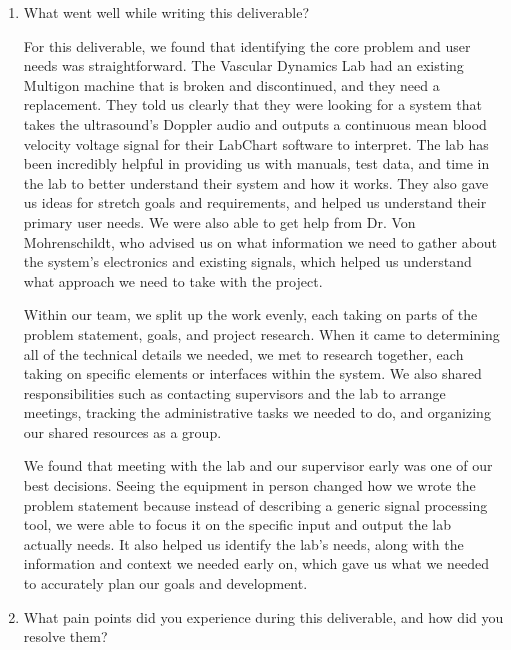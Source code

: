 \documentclass{article}
\begin{document}
% 

\begin{enumerate}
    \item What went well while writing this deliverable? 

    For this deliverable, we found that identifying the core problem and user
    needs was straightforward. The Vascular Dynamics Lab had an existing
    Multigon machine that is broken and discontinued, and they need a
    replacement. They told us clearly that they were looking for a system that
    takes the ultrasound's Doppler audio and outputs a continuous mean blood
    velocity voltage signal for their LabChart software to interpret. The lab
    has been incredibly helpful in providing us with manuals, test data, and
    time in the lab to better understand their system and how it works. They
    also gave us ideas for stretch goals and requirements, and helped us
    understand their primary user needs. We were also able to get help from
    Dr. Von Mohrenschildt, who advised us on what information we need to gather
    about the system's electronics and existing signals, which helped us
    understand what approach we need to take with the project.

    Within our team, we split up the work evenly, each taking on parts of the
    problem statement, goals, and project research. When it came to determining
    all of the technical details we needed, we met to research together, each
    taking on specific elements or interfaces within the system. We also shared
    responsibilities such as contacting supervisors and the lab to arrange
    meetings, tracking the administrative tasks we needed to do, and organizing
    our shared resources as a group.

    We found that meeting with the lab and our supervisor early was one of our
    best decisions. Seeing the equipment in person changed how we wrote the
    problem statement because instead of describing a generic signal processing
    tool, we were able to focus it on the specific input and output the lab
    actually needs. It also helped us identify the lab's needs, along with the
    information and context we needed early on, which gave us what we needed to
    accurately plan our goals and development.

    \item What pain points did you experience during this deliverable, and how
    did you resolve them?


\end{enumerate}
\end{document}
